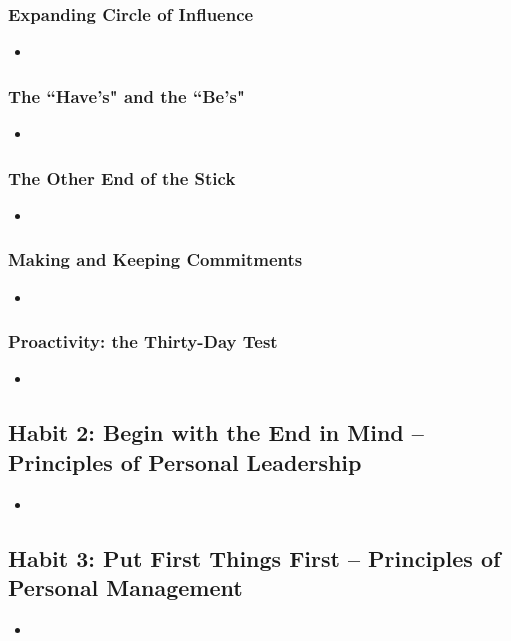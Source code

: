 \documentclass[11pt]{article}
\begin{document}
\subsubsection{Expanding Circle of Influence}
\begin{itemize}
\item 
\end{itemize}
\subsubsection{The ``Have's" and the ``Be's"}
\begin{itemize}
\item 
\end{itemize}
\subsubsection{The Other End of the Stick}
\begin{itemize}
\item 
\end{itemize}
\subsubsection{Making and Keeping Commitments}
\begin{itemize}
\item 
\end{itemize}
\subsubsection{Proactivity: the Thirty-Day Test}
\begin{itemize}
\item 
\end{itemize}
\subsection{Habit 2: Begin with the End in Mind -- Principles of Personal Leadership}
\begin{itemize}
\item 
\end{itemize}
\subsection{Habit 3: Put First Things First -- Principles of Personal Management}
\begin{itemize}
\item 
\end{itemize}
\end{document}
